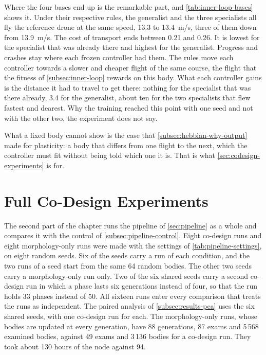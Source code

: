 Where the four bases end up is the remarkable part, and \autoref{tab:inner-loop-bases} shows it. Under their respective rules, the generalist and the three specialists all fly the reference drone at the same speed, 13.3 to 13.4~m/s, three of them down from 13.9~m/s. The cost of transport ends between 0.21 and 0.26. It is lowest for the specialist that was already there and highest for the generalist. Progress and crashes stay where each frozen controller had them. The rules move each controller towards a slower and cheaper flight of the same course, the flight that the fitness of \autoref{subsec:inner-loop} rewards on this body. What each controller gains is the distance it had to travel to get there: nothing for the specialist that was there already, 3.4 for the generalist, about ten for the two specialists that flew fastest and dearest. Why the training reached this point with one seed and not with the other two, the experiment does not say. 

What a fixed body cannot show is the case that \autoref{subsec:hebbian-why-output} made for plasticity: a body that differs from one flight to the next, which the controller must fit without being told which one it is. That is what \autoref{sec:codesign-experiments} is for.

\section{Full Co-Design Experiments}
\label{sec:codesign-experiments}

The second part of the chapter runs the pipeline of \autoref{sec:pipeline} as a whole and compares it with the control of \autoref{subsec:pipeline-control}. Eight co-design runs and eight morphology-only runs were made with the settings of \autoref{tab:pipeline-settings}, on eight random seeds. Six of the seeds carry a run of each condition, and the two runs of a seed start from the same 64 random bodies. The other two seeds carry a morphology-only run only. Two of the six shared seeds carry a second co-design run in which a phase lasts six generations instead of four, so that the run holds 33 phases instead of 50. All sixteen runs enter every comparison that treats the runs as independent. The paired analysis of \autoref{subsec:results-pca} uses the six shared seeds, with one co-design run for each. The morphology-only runs, whose bodies are updated at every generation, have 88 generations, 87 exams and 5\,568 examined bodies, against 49 exams and 3\,136 bodies for a co-design run. They took about 130 hours of the node against 94.

